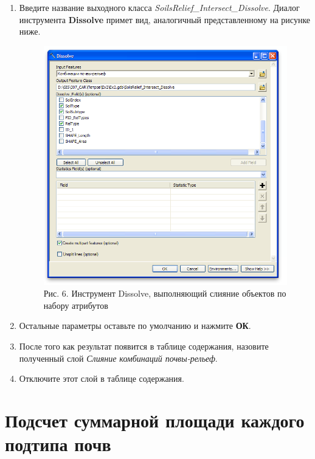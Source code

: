 \documentclass[]{book}
\theoremstyle{definition}
\theoremstyle{definition}
\theoremstyle{definition}
\theoremstyle{remark}
\begin{document}
\begin{enumerate}
\def\labelenumi{\arabic{enumi}.}
\setcounter{enumi}{3}
\item
  Введите название выходного класса
  \emph{SoilsRelief\_Intersect\_Dissolve}. Диалог инструмента
  \textbf{Dissolve} примет вид, аналогичный представленному на рисунке
  ниже.

  \begin{figure}
  \centering
  \includegraphics{images/Ex10/image10.png}
  \caption{Рис. 6. Инструмент Dissolve, выполняющий слияние объектов по
  набору атрибутов}
  \end{figure}
\item
  Остальные параметры оставьте по умолчанию и нажмите \textbf{ОК}.
\item
  После того как результат появится в таблице содержания, назовите
  полученный слой \emph{Слияние комбинаций почвы-рельеф}.
\item
  Отключите этот слой в таблице содержания.
\end{enumerate}

\hypertarget{overlay-sumarea-subtypes}{%
\section{Подсчет суммарной площади каждого подтипа
почв}\label{overlay-sumarea-subtypes}}
\end{document}
